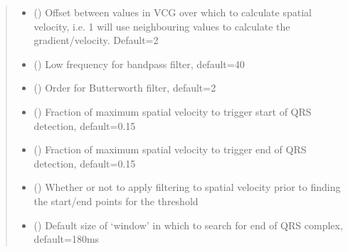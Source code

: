 \documentclass[letterpaper,10pt,english]{sphinxmanual}
\begin{document}
\begin{fulllineitems}
\begin{quote}
\begin{description}
\begin{itemize}
\item {} 
\sphinxAtStartPar
{} (\sphinxstyleliteralemphasis{\sphinxupquote{, }}) \textendash{} Offset between values in VCG over which to calculate spatial velocity, i.e. 1 will use neighbouring values to
calculate the gradient/velocity. Default=2

\item {} 
\sphinxAtStartPar
{} (\sphinxstyleliteralemphasis{\sphinxupquote{, }}) \textendash{} Low frequency for bandpass filter, default=40

\item {} 
\sphinxAtStartPar
{} (\sphinxstyleliteralemphasis{\sphinxupquote{, }}) \textendash{} Order for Butterworth filter, default=2

\item {} 
\sphinxAtStartPar
{} (\sphinxstyleliteralemphasis{\sphinxupquote{, }}) \textendash{} Fraction of maximum spatial velocity to trigger start of QRS detection, default=0.15

\item {} 
\sphinxAtStartPar
{} (\sphinxstyleliteralemphasis{\sphinxupquote{, }}) \textendash{} Fraction of maximum spatial velocity to trigger end of QRS detection, default=0.15

\item {} 
\sphinxAtStartPar
{} (\sphinxstyleliteralemphasis{\sphinxupquote{, }}) \textendash{} Whether or not to apply filtering to spatial velocity prior to finding the start/end points for the threshold

\item {} 
\sphinxAtStartPar
{} (\sphinxstyleliteralemphasis{\sphinxupquote{, }}) \textendash{} Default size of ‘window’ in which to search for end of QRS complex, default=180ms


\end{itemize}
\end{description}
\end{quote}
\end{fulllineitems}
\end{document}
